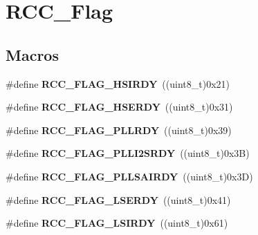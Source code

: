 \hypertarget{group___r_c_c___flag}{}\section{R\+C\+C\+\_\+\+Flag}
\label{group___r_c_c___flag}
\subsection*{Macros}
\begin{DoxyCompactItemize}
\item 
\mbox{\label{group___r_c_c___flag_ga827d986723e7ce652fa733bb8184d216}} 
\#define {\bfseries R\+C\+C\+\_\+\+F\+L\+A\+G\+\_\+\+H\+S\+I\+R\+DY}~((uint8\+\_\+t)0x21)
\item 
\mbox{\label{group___r_c_c___flag_ga173edf47bec93cf269a0e8d0fec9997c}} 
\#define {\bfseries R\+C\+C\+\_\+\+F\+L\+A\+G\+\_\+\+H\+S\+E\+R\+DY}~((uint8\+\_\+t)0x31)
\item 
\mbox{\label{group___r_c_c___flag_gaf82d8afb18d9df75db1d6c08b9c50046}} 
\#define {\bfseries R\+C\+C\+\_\+\+F\+L\+A\+G\+\_\+\+P\+L\+L\+R\+DY}~((uint8\+\_\+t)0x39)
\item 
\mbox{\label{group___r_c_c___flag_ga31e67a9f19cf673acf196d19f443f3d5}} 
\#define {\bfseries R\+C\+C\+\_\+\+F\+L\+A\+G\+\_\+\+P\+L\+L\+I2\+S\+R\+DY}~((uint8\+\_\+t)0x3\+B)
\item 
\mbox{\label{group___r_c_c___flag_ga950937b7612d558939956056d9632b96}} 
\#define {\bfseries R\+C\+C\+\_\+\+F\+L\+A\+G\+\_\+\+P\+L\+L\+S\+A\+I\+R\+DY}~((uint8\+\_\+t)0x3\+D)
\item 
\mbox{\label{group___r_c_c___flag_gac9fb963db446c16e46a18908f7fe1927}} 
\#define {\bfseries R\+C\+C\+\_\+\+F\+L\+A\+G\+\_\+\+L\+S\+E\+R\+DY}~((uint8\+\_\+t)0x41)
\item 
\mbox{\label{group___r_c_c___flag_ga8c5e4992314d347597621bfe7ab10d72}} 
\#define {\bfseries R\+C\+C\+\_\+\+F\+L\+A\+G\+\_\+\+L\+S\+I\+R\+DY}~((uint8\+\_\+t)0x61)
\item 
\mbox{\label{group___r_c_c___flag_ga23d5211abcdf0e397442ca534ca04bb4}} 

\end{DoxyCompactItemize}
